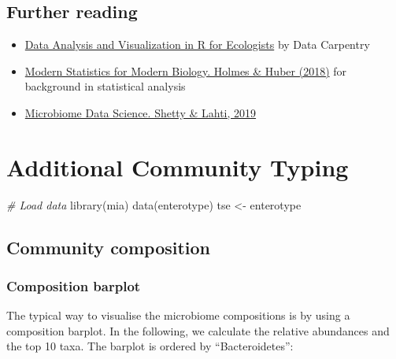 \documentclass[
  oneside]{book}
\newenvironment{Shaded}{\begin{snugshade}}{\end{snugshade}}
\newcommand{\CommentTok}[1]{\textcolor[rgb]{0.56,0.35,0.01}{\textit{#1}}}
\newcommand{\FunctionTok}[1]{\textcolor[rgb]{0.00,0.00,0.00}{#1}}
\newcommand{\NormalTok}[1]{#1}
\newcommand{\OtherTok}[1]{\textcolor[rgb]{0.56,0.35,0.01}{#1}}
\begin{document}
\hypertarget{further-reading}{%
\section{Further reading}\label{further-reading}}

\begin{itemize}
\item
  \href{https://datacarpentry.org/R-ecology-lesson/}{Data Analysis and Visualization in R for Ecologists} by Data Carpentry
\item
  \href{http://web.stanford.edu/class/bios221/book/}{Modern Statistics for Modern Biology. Holmes \& Huber (2018)} for background in statistical analysis
\item
  \href{https://openresearchlabs.github.io/publications/papers/2018-Shetty-Lahti-MDS.pdf}{Microbiome Data Science. Shetty \& Lahti, 2019}
\end{itemize}

\hypertarget{additional-community-typing}{%
\chapter{Additional Community Typing}\label{additional-community-typing}}

\begin{Shaded}
\begin{Highlighting}[]
\CommentTok{\# Load data}
\FunctionTok{library}\NormalTok{(mia)}
\FunctionTok{data}\NormalTok{(enterotype)}
\NormalTok{tse }\OtherTok{\textless{}{-}}\NormalTok{ enterotype}
\end{Highlighting}
\end{Shaded}

\hypertarget{community-composition}{%
\section{Community composition}\label{community-composition}}

\hypertarget{composition-barplot}{%
\subsection{Composition barplot}\label{composition-barplot}}

The typical way to visualise the microbiome compositions is by using a composition barplot.
In the following, we calculate the relative abundances and the top 10 taxa. The barplot is ordered by ``Bacteroidetes'':
\end{document}
